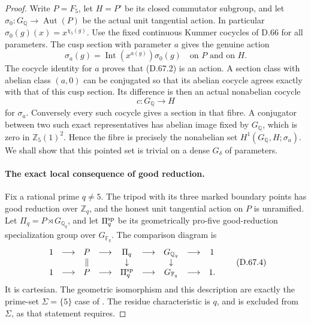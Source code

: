 \begin{proof}
Write \(P=F_5\), let \(H=P'\) be its closed commutator
subgroup, and let \(\sigma_0:G_{\mathbb Q}\to\operatorname{Aut}(P)\)
be the actual unit tangential action. In particular
\(\sigma_0(g)(x)=x^{\chi_5(g)}\). Use the fixed continuous
Kummer cocycles of D.66 for all parameters. The cusp
section with parameter \(a\) gives the genuine action
\[
 \sigma_a(g)=\operatorname{Int}(x^{a(g)})\sigma_0(g)
                  \quad\text{on }P\text{ and on }H.     \tag{D.67.2}
\]
The cocycle identity for \(a\) proves that (D.67.2) is
an action. A section class with abelian class \((a,0)\)
can be conjugated so that its abelian cocycle agrees
exactly with that of this cusp section. Its difference
is then an actual nonabelian cocycle
\[
                           c:G_{\mathbb Q}\longrightarrow H
                                                        \tag{D.67.3}
\]
for \(\sigma_a\). Conversely every such cocycle gives
a section in that fibre. A conjugator between two
such exact representatives has abelian image fixed
by \(G_{\mathbb Q}\), which is zero in
\(\mathbb Z_5(1)^2\). Hence the fibre is precisely
the nonabelian set \(H^1(G_{\mathbb Q},H;\sigma_a)\).
We shall show that this pointed set is trivial on a
dense \(G_\delta\) of parameters.

\paragraph{The exact local consequence of good reduction.}
Fix a rational prime \(q\ne5\). The tripod with its
three marked boundary points has good reduction over
\(\mathbb Z_q\), and the honest unit tangential action
on \(P\) is unramified. Let \(\Pi_q=P\rtimes G_{\mathbb Q_q}\),
and let \(\Pi_q^{\rm sp}\) be its geometrically pro-five
good-reduction specialization group over
\(G_{\mathbb F_q}\). The comparison diagram is
\[
\begin{array}{ccccccccc}
1&\longrightarrow&P&\longrightarrow&\Pi_q&\longrightarrow&G_{\mathbb Q_q}&\longrightarrow&1\\
 &&\Vert&&\downarrow&&\downarrow\\
1&\longrightarrow&P&\longrightarrow&\Pi_q^{\rm sp}&\longrightarrow&G_{\mathbb F_q}&\longrightarrow&1.
\end{array}                                               \tag{D.67.4}
\]
It is cartesian. The geometric isomorphism and this
description are exactly the prime-set \(\Sigma=\{5\}\)
case of \cite[Definition A.3 and Remark A.3.1, p.~38]{DE_Hoshi2012}.
The residue characteristic is \(q\), and is excluded
from \(\Sigma\), as that statement requires.


\end{proof}
